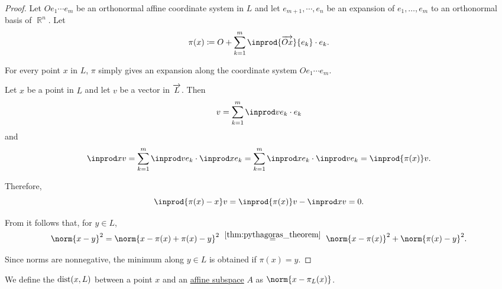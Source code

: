 \begin{proof}
  Let \( O e_1 \cdots e_m \) be an orthonormal affine coordinate system in \( L \) and let \( e_{m+1}, \cdots, e_n \) be an expansion of \( e_1, \ldots, e_m \) to an orthonormal basis of \( \BbbR^n \). Let
  \begin{equation*}
    \pi(x) \coloneqq O + \sum_{k=1}^m \inprod {\vect{Ox}} {e_k} \cdot e_k.
  \end{equation*}

   For every point \( x \) in \( L \), \( \pi \) simply gives an expansion along the coordinate system \( O e_1 \cdots e_m \).

   Let \( x \) be a point in \( L \) and let \( v \) be a vector in \( \overrightarrow{L} \). Then
  \begin{equation*}
    v = \sum_{k=1}^m \inprod v {e_k} \cdot e_k
  \end{equation*}
  and
  \begin{equation*}
    \inprod x v
    =
    \sum_{k=1}^m \inprod v {e_k} \cdot \inprod x {e_k}
    =
    \sum_{k=1}^m \inprod x {e_k} \cdot \inprod v {e_k}
    =
    \inprod {\pi(x)} v.
  \end{equation*}

  Therefore,
  \begin{equation*}
    \inprod {\pi(x) - x} v
    =
    \inprod {\pi(x)} v - \inprod x v
    =
    0.
  \end{equation*}

   From  it follows that, for \( y \in L \),
  \begin{equation*}
    \norm{ x - y }^2
    =
    \norm{ x - \pi(x) + \pi(x) - y }^2
    \reloset {\ref{thm:pythagoras_theorem}} =
    \norm{ x - \pi(x) }^2 + \norm{ \pi(x) - y }^2.
  \end{equation*}

  Since norms are nonnegative, the minimum along \( y \in L \) is obtained if \( \pi(x) = y \).
\end{proof}

\begin{definition}\label{def:distance_to_subspace}
  We define the  \( \op{dist}(x, L) \) between a point \( x \) and an \hyperref[def:affine_subspace]{affine subspace} \( A \) as \( \norm{ x - \pi_L(x) } \).
\end{definition}

